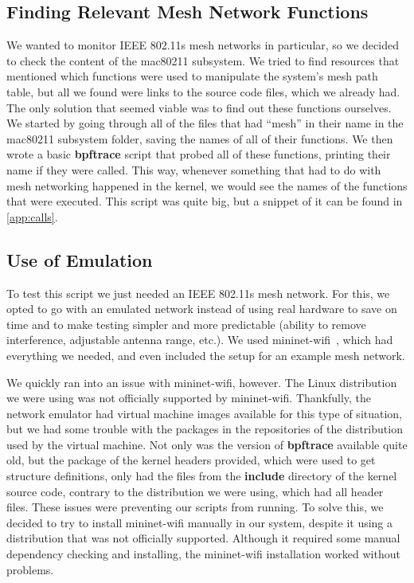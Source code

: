 \subsection{Finding Relevant Mesh Network Functions}\label{subs:mesh}

We wanted to monitor \ac{IEEE} 802.11s mesh networks in particular, so we
decided to check the content of the mac80211 subsystem. We tried to find
resources that mentioned which functions were used to manipulate the system's
mesh path table, but all we found were links to the source code files, which we
already had. The only solution that seemed viable was to find out these
functions ourselves. We started by going through all of the files that had
``mesh'' in their name in the mac80211 subsystem folder, saving the names of all
of their functions. We then wrote a basic \textbf{bpftrace} script that probed
all of these functions, printing their name if they were called. This way,
whenever something that had to do with mesh networking happened in the kernel,
we would see the names of the functions that were executed. This script was
quite big, but a snippet of it can be found in \autoref{app:calls}.


\subsection{Use of Emulation}

To test this script we just needed an \ac{IEEE} 802.11s mesh network. For this,
we opted to go with an emulated network instead of using real hardware to save
on time and to make testing simpler and more predictable (ability to remove
interference, adjustable antenna range, etc.). We used
mininet-wifi~\cite{mnwifi}, which had everything we needed, and even included
the setup for an example mesh network.

We quickly ran into an issue with mininet-wifi, however. The Linux distribution
we were using was not officially supported by mininet-wifi. Thankfully, the
network emulator had virtual machine images available for this type of
situation, but we had some trouble with the packages in the repositories of the
distribution used by the virtual machine. Not only was the version of
\textbf{bpftrace} available quite old, but the package of the kernel headers
provided, which were used to get structure definitions, only had the files from
the \textbf{include} directory of the kernel source code, contrary to the
distribution we were using, which had all header files. These issues were
preventing our scripts from running. To solve this, we decided to try to install
mininet-wifi manually in our system, despite it using a distribution that was
not officially supported. Although it required some manual dependency checking
and installing, the mininet-wifi installation worked without problems.


